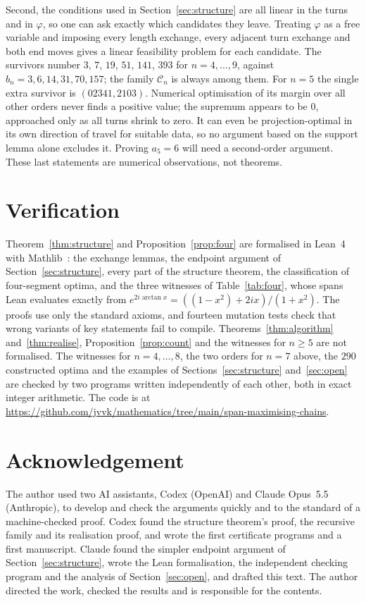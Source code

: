 \documentclass[11pt]{article}
\theoremstyle{remark}
\newcommand{\cC}{\mathcal C}
\begin{document}
Second, the conditions used in Section~\ref{sec:structure} are all linear in the turns and in $\varphi$, so one can ask exactly which candidates they leave. Treating $\varphi$ as a free variable and imposing every length exchange, every adjacent turn exchange and both end moves gives a linear feasibility problem for each candidate. The survivors number $3$, $7$, $19$, $51$, $141$, $393$ for $n=4,\dots,9$, against $b_n=3,6,14,31,70,157$; the family $\cC_n$ is always among them. For $n=5$ the single extra survivor is $(02341,2103)$. Numerical optimisation of its margin over all other orders never finds a positive value; the supremum appears to be $0$, approached only as all turns shrink to zero. It can even be projection-optimal in its own direction of travel for suitable data, so no argument based on the support lemma alone excludes it. Proving $a_5=6$ will need a second-order argument. These last statements are numerical observations, not theorems.

\section{Verification}

Theorem~\ref{thm:structure} and Proposition~\ref{prop:four} are formalised in Lean~4 with Mathlib~\cite{mathlib}: the exchange lemmas, the endpoint argument of Section~\ref{sec:structure}, every part of the structure theorem, the classification of four-segment optima, and the three witnesses of Table~\ref{tab:four}, whose spans Lean evaluates exactly from $e^{2i\arctan x}=((1-x^2)+2ix)/(1+x^2)$. The proofs use only the standard axioms, and fourteen mutation tests check that wrong variants of key statements fail to compile. Theorems~\ref{thm:algorithm} and~\ref{thm:realise}, Proposition~\ref{prop:count} and the witnesses for $n\ge5$ are not formalised. The witnesses for $n=4,\dots,8$, the two orders for $n=7$ above, the $290$ constructed optima and the examples of Sections~\ref{sec:structure} and~\ref{sec:open} are checked by two programs written independently of each other, both in exact integer arithmetic. The code is at \url{https://github.com/jvvk/mathematics/tree/main/span-maximising-chains}.

\section*{Acknowledgement}
The author used two AI assistants, Codex (OpenAI) and Claude Opus~5.5 (Anthropic), to develop and check the arguments quickly and to the standard of a machine-checked proof. Codex found the structure theorem's proof, the recursive family and its realisation proof, and wrote the first certificate programs and a first manuscript. Claude found the simpler endpoint argument of Section~\ref{sec:structure}, wrote the Lean formalisation, the independent checking program and the analysis of Section~\ref{sec:open}, and drafted this text. The author directed the work, checked the results and is responsible for the contents.
\end{document}
